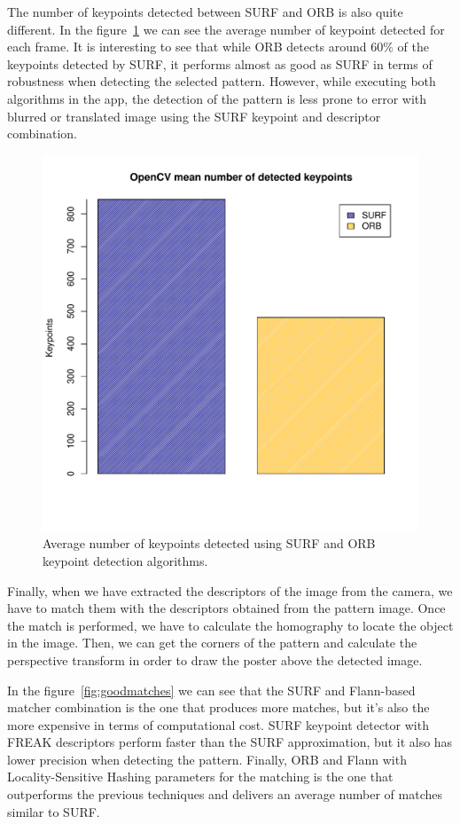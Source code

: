 The number of keypoints detected between SURF and ORB is also quite different. In
the figure~\ref{fig:numberkp} we can see the average number of keypoint detected for
each frame. It is interesting to see that while ORB detects around 60\% of the
keypoints detected by SURF, it performs almost as good as SURF in terms of
robustness when detecting the selected pattern. However, while executing both
algorithms in the app, the detection of the pattern is less prone to error with
blurred or translated image using the SURF keypoint and descriptor combination. 

\begin{figure}
\centering
\includegraphics[scale=0.75]{performance/keypoints-number.pdf}
\caption{\label{fig:numberkp} Average number of keypoints detected using SURF and
  ORB keypoint detection algorithms.}
\end{figure} 

Finally, when we have extracted the descriptors of the image from the camera, we
have to match them with the descriptors obtained from the pattern image. Once the
match is performed, we have to calculate the homography to locate the object in the
image. Then, we can get the corners of the pattern and calculate the perspective
transform in order to draw the poster above the detected image. 

In the figure~\ref{fig:goodmatches} we can see that the SURF and Flann-based matcher
combination is the one that produces more matches, but it's also the more expensive
in terms of computational cost. SURF keypoint detector with FREAK descriptors
perform faster than the SURF approximation, but it also has lower precision when
detecting the pattern. Finally, ORB and Flann with Locality-Sensitive Hashing
parameters for the matching is the one that outperforms the previous techniques and
delivers an average number of matches similar to SURF.


